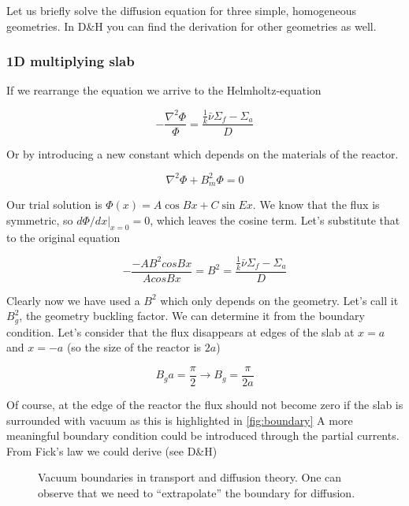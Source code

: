 Let us briefly solve the diffusion equation for three simple, homogeneous geometries. In D\&H you can find the derivation for other geometries as well.

\subsubsection*{1D multiplying slab}

If we rearrange the equation we arrive to the Helmholtz-equation

\begin{equation}
-\frac{\nabla^2 \Phi}{\Phi}=\frac{\frac{1}{k}\bar\nu\Sigma_f-\Sigma_a}{D}
\end{equation}

Or by introducing a new constant which depends on the materials of the reactor.

\begin{equation}
\nabla^2 \Phi+B_m^2\Phi=0
\end{equation}

Our trial solution is $\Phi(x)=A\cos Bx+C\sin Ex$. We know that the flux is symmetric, so  $d\Phi/dx|_{x=0}=0$, which leaves the cosine term. Let's substitute that to the original equation

\begin{equation}
-\frac{-AB^2cosBx}{AcosBx}=B^2=\frac{\frac{1}{k}\bar\nu\Sigma_f-\Sigma_a}{D}
\end{equation}

Clearly now we have used a $B^2$ which only depends on the geometry. Let's call it $B_g^2$, the geometry buckling factor. We can determine it from the boundary condition. Let's consider that the flux disappears at edges of the slab at $x=a$ and $x=-a$ (so the size of the reactor is $2a$)

\[
B_ga=\frac{\pi}{2} \rightarrow B_g=\frac{\pi}{2a}
\]

Of course, at the edge of the reactor the flux should not become zero if the slab is surrounded with vacuum as this is highlighted in \autoref{fig:boundary} A more meaningful boundary condition could be introduced through the partial currents. From Fick's law we could derive (see D\&H)

\begin{figure}[ht!]
\protect {}\protect
\caption{\label{fig:boundary} \footnotesize{Vacuum boundaries in transport and diffusion theory. One can observe that we need to ``extrapolate'' the boundary for diffusion.}}
\end{figure} 


